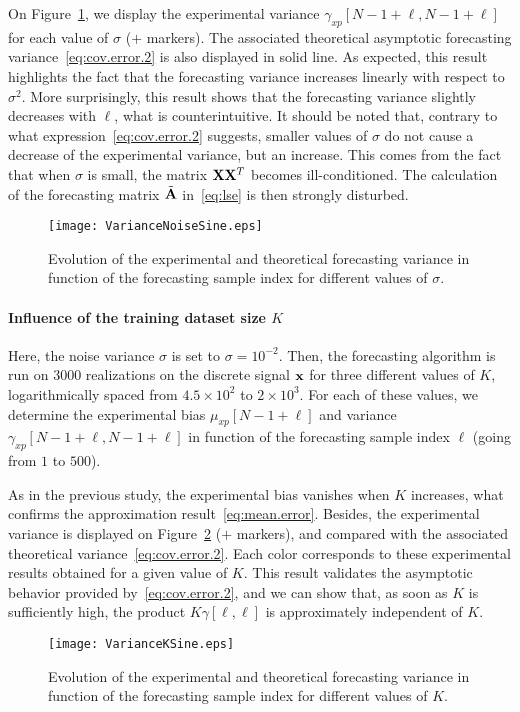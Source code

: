 On Figure~\ref{fig:res.noise.sine}, we display the experimental variance $\gamma_{xp}[N-1+\ell,N-1+\ell]$ for each value of $\sigma$ ($+$ markers). The associated theoretical asymptotic forecasting variance~\eqref{eq:cov.error.2} is also displayed in solid line. As expected, this result highlights the fact that the forecasting variance increases linearly with respect to $\sigma^2$. More surprisingly, this result shows that the forecasting variance slightly decreases with $\ell$, what is counterintuitive. It should be noted that, contrary to what expression~\eqref{eq:cov.error.2} suggests, smaller values of $\sigma$ do not  cause a decrease of the experimental variance, but an increase. This comes from the fact that when $\sigma$ is small, the matrix ${\mathbf X}{\mathbf X}^T$ becomes ill-conditioned. The calculation of the forecasting matrix $\tilde{{\mathbf A}}$ in~\eqref{eq:lse} is then strongly disturbed.
\begin{figure}
\texttt{[image: VarianceNoiseSine.eps]}
\caption{Evolution of the experimental and theoretical forecasting variance in function of the forecasting sample index for different values of $\sigma$.}
\label{fig:res.noise.sine}
\end{figure}

\paragraph{Influence of the training dataset size $K$} Here, the noise variance $\sigma$ is set to $\sigma=10^{-2}$. Then, the forecasting algorithm is run on 3000 realizations on the discrete signal ${\mathbf x}$ for three different values of $K$, logarithmically spaced from $4.5\times 10^{2}$ to $2\times 10^{3}$. For each of these values, we determine the experimental bias $\mu_{xp}[N-1+\ell]$ and variance $\gamma_{xp}[N-1+\ell,N-1+\ell]$ in function of the forecasting sample index $\ell$ (going from $1$ to $500$). 

As in the previous study, the experimental bias vanishes when $K$ increases, what confirms the approximation result~\eqref{eq:mean.error}. Besides, the experimental variance  is displayed on Figure~\ref{fig:res.size.sine} ($+$ markers), and compared with the associated theoretical variance~\eqref{eq:cov.error.2}. Each color corresponds to these experimental results obtained for a given value of $K$. This result validates the asymptotic behavior provided by~\eqref{eq:cov.error.2}, and we can show that, as soon as $K$ is sufficiently high, the product $K\gamma[\ell,\ell]$ is approximately independent of $K$.
\begin{figure}
\texttt{[image: VarianceKSine.eps]}
\caption{Evolution of the experimental and theoretical forecasting variance in function of the forecasting sample index for different values of $K$.}
\label{fig:res.size.sine}
\end{figure}

